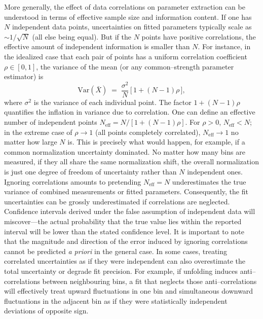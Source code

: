    More generally, the effect of data correlations on parameter extraction can be understood in terms of effective sample size and information content.
    If one has $N$ independent data points, uncertainties on fitted parameters typically scale as $\sim 1/\sqrt{N}$ (all else being equal).
    But if the $N$ points have positive correlations, the effective amount of independent information is smaller than $N$.
    For instance, in the idealized case that each pair of points has a uniform correlation coefficient $\rho\in[0, 1]$, the variance of the mean (or any common--strength parameter estimator) is
    \begin{equation}
        \label{eq:effective-N}
        \mathrm{Var}(\bar{X}) \;=\; \frac{\sigma^2}{N}\,\Big[\,1 + (N-1)\rho\,\Big],
    \end{equation}
    where $\sigma^2$ is the variance of each individual point.
    The factor $1+(N-1)\rho$ quantifies the inflation in variance due to correlation.
    One can define an effective number of independent points $N_{\text{eff}} = N/[1+(N-1)\rho]$.
    For $\rho>0$, $N_{\text{eff}}<N$; in the extreme case of $\rho\to 1$ (all points completely correlated), $N_{\text{eff}}\to 1$ no matter how large $N$ is.
    This is precisely what would happen, for example, if a common normalization uncertainty dominated.
    No matter how many bins are measured, if they all share the same normalization shift, the overall normalization is just one degree of freedom of uncertainty rather than $N$ independent ones.
    Ignoring correlations amounts to pretending $N_{\text{eff}} = N$ underestimates the true variance of combined measurements or fitted parameters.
    Consequently, the fit uncertainties can be grossly underestimated if correlations are neglected.
    Confidence intervals derived under the false assumption of independent data will miscover---the actual probability that the true value lies within the reported interval will be lower than the stated confidence level.
    It is important to note that the magnitude and direction of the error induced by ignoring correlations cannot be predicted \textit{a priori} in the general case.
    In some cases, treating correlated uncertainties as if they were independent can also overestimate the total uncertainty or degrade fit precision.
    For example, if unfolding induces anti--correlations between neighbouring bins, a fit that neglects those anti--correlations will effectively treat upward fluctuations in one bin and simultaneous downward fluctuations in the adjacent bin as if they were statistically independent deviations of opposite sign.
